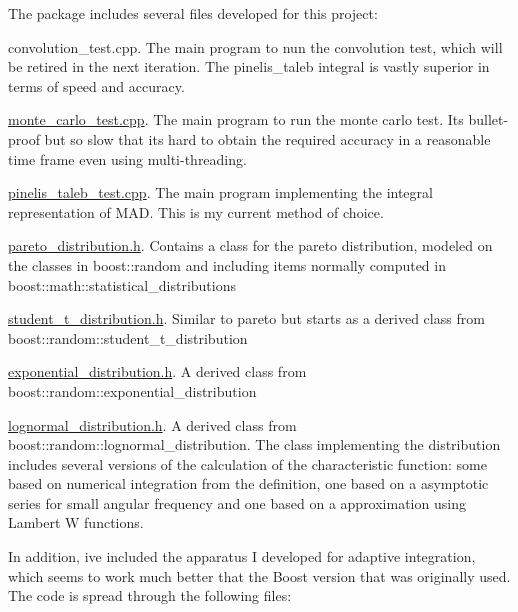 The package includes several files developed for this project\+:


\begin{DoxyItemize}
\item convolution\+\_\+test.\+cpp. The main program to nun the convolution test, which will be retired in the next iteration. The pinelis\+\_\+taleb integral is vastly superior in terms of speed and accuracy.
\item \mbox{\hyperlink{monte__carlo__test_8cpp}{monte\+\_\+carlo\+\_\+test.\+cpp}}. The main program to run the monte carlo test. It\textquotesingle{}s bullet-\/proof but so slow that it\textquotesingle{}s hard to obtain the required accuracy in a reasonable time frame even using multi-\/threading.
\item \mbox{\hyperlink{pinelis__taleb__test_8cpp}{pinelis\+\_\+taleb\+\_\+test.\+cpp}}. The main program implementing the integral representation of M\+AD. This is my current method of choice.
\item \mbox{\hyperlink{pareto__distribution_8h}{pareto\+\_\+distribution.\+h}}. Contains a class for the pareto distribution, modeled on the classes in boost\+::random and including items normally computed in boost\+::math\+::statistical\+\_\+distributions
\item \mbox{\hyperlink{student__t__distribution_8h}{student\+\_\+t\+\_\+distribution.\+h}}. Similar to pareto but starts as a derived class from boost\+::random\+::student\+\_\+t\+\_\+distribution
\item \mbox{\hyperlink{exponential__distribution_8h}{exponential\+\_\+distribution.\+h}}. A derived class from boost\+::random\+::exponential\+\_\+distribution
\item \mbox{\hyperlink{lognormal__distribution_8h}{lognormal\+\_\+distribution.\+h}}. A derived class from boost\+::random\+::lognormal\+\_\+distribution. The class implementing the distribution includes several versions of the calculation of the characteristic function\+: some based on numerical integration from the definition, one based on a asymptotic series for small angular frequency and one based on a approximation using Lambert W functions.
\end{DoxyItemize}

In addition, i\textquotesingle{}ve included the apparatus I developed for adaptive integration, which seems to work much better that the Boost version that was originally used. The code is spread through the following files\+:


